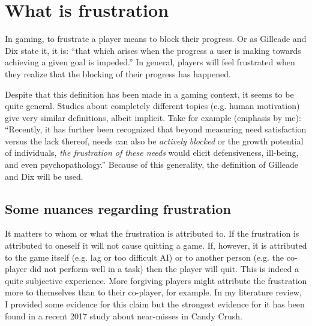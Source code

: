 \section{What is frustration}

In gaming, to frustrate a player means to block their progress. Or as Gilleade and Dix state it, it is: ``that which arises when the progress a user is making towards achieving a given goal is
impeded.'' \cite{gilleade2004} In general, players will feel frustrated when they realize that the blocking of their progress has happened. 

Despite that this definition has been made in a gaming context, it seems to be quite general. Studies about completely different topics (e.g. human motivation) give very similar definitions, albeit implicit. Take for example (emphasis by me): ``Recently, it has further been recognized that beyond measuring need satisfaction versus the lack thereof, needs can also be \textit{actively blocked} or the growth potential of individuals, \textit{the frustration of these needs} would elicit defensiveness, ill-being, and even psychopathology.'' \cite{chen2015} Because of this generality, the definition of Gilleade and Dix will be used.


\subsection{Some nuances regarding frustration}
It matters to whom or what the frustration is attributed to. If the frustration is attributed to oneself it will not cause quitting a game. If, however, it is attributed to the game itself (e.g. lag or too difficult AI) or to another person (e.g. the co-player did not perform well in a task) then the player will quit. This is indeed a quite subjective experience. More forgiving players might attribute the frustration more to themselves than to their co-player, for example. In my literature review, I provided some evidence for this claim but the strongest evidence for it has been found in a recent 2017 study about near-misses in Candy Crush.


